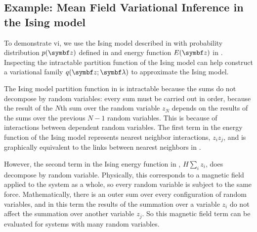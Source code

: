 \subsection{Example: Mean Field Variational Inference in the Ising model}
\label{sec:ising-mean-field}

To demonstrate \gls{vi}, we use the Ising model described in  with probability distribution $p(\mbz)$ defined in  and energy function $E(\mbz)$ in . Inspecting the intractable partition function of the Ising model can help construct a variational family $q(\mbz; \mblambda)$ to approximate the Ising model.

The Ising model partition function in  is intractable because the sums do not decompose by random variables: every sum must be carried out in order, because the result of the $N$th sum over the random variable $z_N$ depends on the results of the sums over the previous $N-1$ random variables. This is because of interactions between dependent random variables. The first term in the energy function of the Ising model represents nearest neighbor interactions, $z_iz_j$, and is graphically equivalent to the links between nearest neighbors in .

However, the second term in the Ising energy function in , $H\sum_i z_i$, does decompose by random variable. Physically, this corresponds to a magnetic field applied to the system as a whole, so every random variable is subject to the same force. Mathematically, there is an outer sum over every configuration of random variables, and in this term the results of the summation over a variable $z_i$ do not affect the summation over another variable $z_j$. So this magnetic field term can be evaluated for systems with many random variables.

